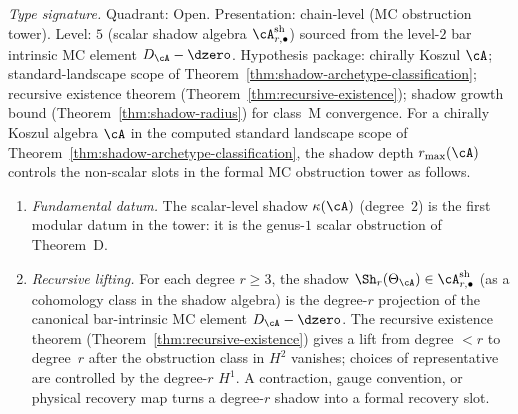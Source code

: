 \begin{theorem}
\label{thm:hc-shadow-redundancy}
\textit{Type signature.} Quadrant: Open. Presentation: chain-level
(MC obstruction tower). Level: $5$ (scalar shadow algebra
$\cA^{\mathrm{sh}}_{r,\bullet}$) sourced from the level-$2$ bar
intrinsic MC element $D_\cA - \dzero$. Hypothesis package: chirally
Koszul $\cA$; standard-landscape scope of
Theorem~\textup{\ref{thm:shadow-archetype-classification}};
recursive existence theorem
(Theorem~\textup{\ref{thm:recursive-existence}}); shadow growth bound
(Theorem~\textup{\ref{thm:shadow-radius}}) for class~M convergence.
\smallskip\noindent
For a chirally Koszul algebra $\cA$ in the computed standard
landscape scope of
Theorem~\textup{\ref{thm:shadow-archetype-classification}}, the shadow
depth $r_{\max}(\cA)$ controls the non-scalar slots in the formal MC
obstruction tower as follows.

\begin{enumerate}[label=\textup{(\roman*)}]
\item \emph{Fundamental datum.}
 The scalar-level shadow $\kappa(\cA)$
 \textup{(}degree~$2$\textup{)} is the first modular datum in the
 tower: it is the genus-$1$ scalar obstruction of Theorem~D.

\item \emph{Recursive lifting.}
 For each degree $r \ge 3$, the shadow
 $\Sh_r(\Theta_\cA) \in \cA^{\mathrm{sh}}_{r,\bullet}$
 \textup{(}as a cohomology class in the shadow algebra\textup{)}
 is the degree-$r$ projection of the canonical bar-intrinsic MC
 element $D_\cA-\dzero$.
 The recursive existence theorem
 \textup{(}Theorem~\textup{\ref{thm:recursive-existence}}\textup{)}
 gives a lift from degree $<r$ to degree~$r$ after the obstruction
 class in $H^2$ vanishes; choices of representative are controlled by
 the degree-$r$ $H^1$.  A contraction, gauge convention, or physical
 recovery map turns a degree-$r$ shadow into a formal recovery slot.


\end{enumerate}
\end{theorem}
